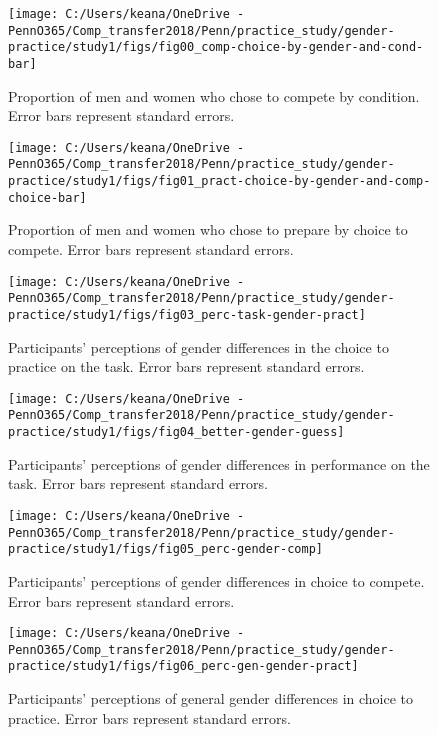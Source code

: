 \documentclass[a4paper,nobind]{templates/ociamthesis}
\begin{document}
\begin{figure}
\texttt{[image: C:/Users/keana/OneDrive - PennO365/Comp\_transfer2018/Penn/practice\_study/gender-practice/study1/figs/fig00\_comp-choice-by-gender-and-cond-bar]} \caption{Proportion of men and women who chose to compete by condition. Error bars represent standard errors.}\label{fig:s100}
\end{figure}

\begin{figure}
\texttt{[image: C:/Users/keana/OneDrive - PennO365/Comp\_transfer2018/Penn/practice\_study/gender-practice/study1/figs/fig01\_pract-choice-by-gender-and-comp-choice-bar]} \caption{Proportion of men and women who chose to prepare by choice to compete. Error bars represent standard errors.}\label{fig:s101}
\end{figure}

\begin{figure}
\texttt{[image: C:/Users/keana/OneDrive - PennO365/Comp\_transfer2018/Penn/practice\_study/gender-practice/study1/figs/fig03\_perc-task-gender-pract]} \caption{Participants' perceptions of gender differences in the choice to practice on the task. Error bars represent standard errors.}\label{fig:s103}
\end{figure}

\begin{figure}
\texttt{[image: C:/Users/keana/OneDrive - PennO365/Comp\_transfer2018/Penn/practice\_study/gender-practice/study1/figs/fig04\_better-gender-guess]} \caption{Participants' perceptions of gender differences in performance on the task. Error bars represent standard errors.}\label{fig:s104}
\end{figure}

\begin{figure}
\texttt{[image: C:/Users/keana/OneDrive - PennO365/Comp\_transfer2018/Penn/practice\_study/gender-practice/study1/figs/fig05\_perc-gender-comp]} \caption{Participants' perceptions of gender differences in choice to compete. Error bars represent standard errors.}\label{fig:s105}
\end{figure}

\begin{figure}
\texttt{[image: C:/Users/keana/OneDrive - PennO365/Comp\_transfer2018/Penn/practice\_study/gender-practice/study1/figs/fig06\_perc-gen-gender-pract]} \caption{Participants' perceptions of general gender differences in choice to practice. Error bars represent standard errors.}\label{fig:s106}
\end{figure}
\end{document}
